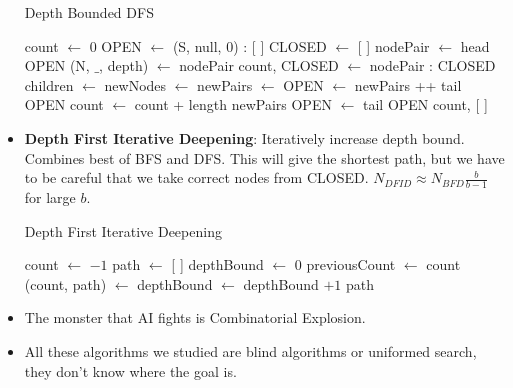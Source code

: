 \documentclass[a4paper]{article}
\begin{document}
\begin{itemize}
\begin{algorithm}[H]
        \caption{Depth Bounded DFS}\label{alg:AI-depth-DFS}
        \begin{algorithmic}[1]
            \State count $\gets$ 0
            \State OPEN $\gets$ (S, null, 0) : [ ]
            \State CLOSED $\gets$ [ ]
                \State nodePair $\gets$ head OPEN
                \State (N, $\_$, depth) $\gets$ nodePair
                    \State \Return count, 
                \EndIf
                \State CLOSED $\gets$ nodePair : CLOSED
                    \State children $\gets$ 
                    \State newNodes $\gets$ 
                    \State newPairs $\gets$ 
                    \State OPEN $\gets$ newPairs ++ tail OPEN
                    \State count $\gets$ count + length newPairs
                \Else
                    \State OPEN $\gets$ tail OPEN
                \EndIf
            \EndWhile
            \State \Return count, [ ]
        \end{algorithmic}
    \end{algorithm}
    \item \textbf{Depth First Iterative Deepening}: Iteratively increase depth bound. Combines best of BFS and DFS. This will give the shortest path, but we have to be careful that we take correct nodes from CLOSED. $N_{DFID}\approx N_{BFD}\frac{b}{b-1}$ for large $b$.
    \begin{algorithm}[H]
        \caption{Depth First Iterative Deepening}\label{alg:AI-depth-first-iterative}
        \begin{algorithmic}[1]
            \State count $\gets$ $-1$
            \State path $\gets$ [ ]
            \State depthBound $\gets$ $0$
            \Repeat
                \State previousCount $\gets$ count
                \State (count, path) $\gets$ 
                \State depthBound $\gets$ depthBound $+1$
            \State \Return path
        \end{algorithmic}
    \end{algorithm}
    \item The monster that AI fights is Combinatorial Explosion.
    \item All these algorithms we studied are blind algorithms or uniformed search, they don't know where the goal is.
\end{itemize}
\end{document}
